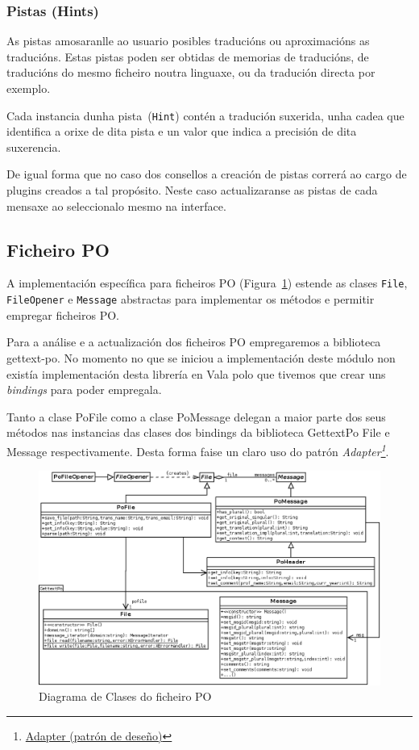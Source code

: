 \subsubsection{Pistas (Hints)}
As pistas amosaranlle ao usuario posibles traducións ou aproximacións as traducións. Estas pistas poden ser obtidas de memorias de traducións, de traducións do mesmo ficheiro noutra linguaxe, ou da tradución directa por exemplo.

Cada instancia dunha pista~(\lstinline{Hint}) contén a tradución suxerida, unha cadea que identifica a orixe de dita pista e un valor que indica a precisión de dita suxerencia.

De igual forma que no caso dos consellos a creación de pistas correrá ao cargo de plugins creados a tal propósito. Neste caso actualizaranse as pistas de cada mensaxe ao seleccionalo mesmo na interface.

\subsection{Ficheiro PO}
A implementación específica para ficheiros PO (Figura~\ref{fig:dia_class:pofile}) estende as clases \lstinline{File}, \lstinline{FileOpener} e \lstinline{Message} abstractas para implementar os métodos e permitir empregar ficheiros PO.

Para a análise e a actualización dos ficheiros PO empregaremos a biblioteca gettext-po. No momento no que se iniciou a implementación deste módulo non existía implementación desta librería en Vala polo que tivemos que crear uns \emph{bindings} para poder empregala.

Tanto a clase PoFile como a clase PoMessage delegan a maior parte dos seus métodos nas instancias das clases dos bindings da biblioteca GettextPo File e Message respectivamente. Desta forma faise un claro uso do patrón \emph{Adapter\footnote{\href{http://gl.wikipedia.org/wiki/Adapter_\%28patr\%C3\%B3n_de_dese\%C3\%B1o\%29}{Adapter (patrón de deseño)}}}.

\begin{figure}[h!]
    \centering
    \includegraphics[width=\textwidth]{img/pofile.png}
    \caption{Diagrama de Clases do ficheiro PO}
    \label{fig:dia_class:pofile}
\end{figure}

